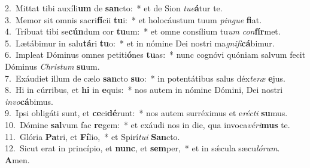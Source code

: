 {2.~}Mittat tibi auxíli\textbf{um} de \textbf{san}cto:~* et de Sion \textit{tu}\textit{e}\textbf{á}tur te.\\
{3.~}Memor sit omnis sacri\textbf{fí}cii \textbf{tu}i:~* et holocáustum tuum \textit{pin}\textit{gue} \textbf{fi}at.\\
{4.~}Tríbuat tibi se\textbf{cún}dum cor \textbf{tu}um:~* et omne consílium tu\textit{um} \textit{con}\textbf{fír}met.\\
{5.~}Lætábimur in salu\textbf{tá}ri \textbf{tu}o:~* et in nómine Dei nostri ma\textit{gni}\textit{fi}\textbf{cá}bimur.\\
{6.~}Impleat Dóminus omnes petiti\textbf{ó}nes \textbf{tu}as:~* nunc cognóvi quóniam salvum fecit Dóminus \textit{Chri}\textit{stum} \textbf{su}um.\\
{7.~}Exáudiet illum de cælo \textbf{san}cto \textbf{su}o:~* in potentátibus salus déx\textit{te}\textit{ræ} \textbf{e}jus.\\
{8.~}Hi in cúrribus, et \textbf{hi} in \textbf{e}quis:~* nos autem in nómine Dómini, Dei nostri \textit{in}\textit{vo}\textbf{cá}bimus.\\
{9.~}Ipsi obligáti sunt, et \textbf{ce}ci\textbf{dé}runt:~* nos autem surréximus et e\textit{ré}\textit{cti} \textbf{su}mus.\\
{10.~}Dómine \textbf{sal}vum fac \textbf{re}gem:~* et exáudi nos in die, qua invoca\textit{vé}\textit{ri}\textbf{mus} te.\\
{11.~}Glória \textbf{Pa}tri, et \textbf{Fí}lio,~* et Spirí\textit{tu}\textit{i} \textbf{San}cto.\\
{12.~}Sicut erat in princípio, et \textbf{nunc}, et \textbf{sem}per,~* et in sǽcula sæcu\textit{ló}\textit{rum}. \textbf{A}men.\\
